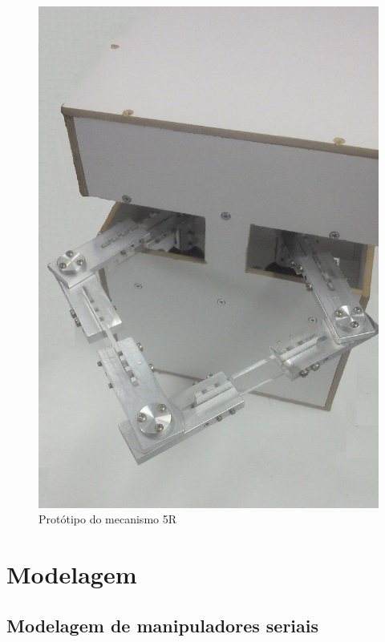 \documentclass[]{politex}
\begin{document}
\begin{figure}[h!]
	\centering
	\includegraphics[scale=0.3]{../figures/Clara.jpg}  
	\caption{Protótipo do mecanismo 5R}
	\label{fig:Mecanismo2}
\end{figure}


\part{Modelagem}
	
\chapter{Modelagem de manipuladores seriais}
\end{document}
